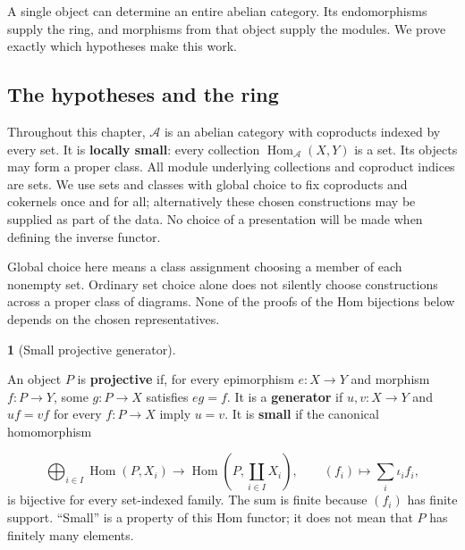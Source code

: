 \documentclass[11pt,a4paper]{article}
\newcommand{\mathheading}{}
\theoremstyle{plain}
\theoremstyle{definition}
\newtheorem*{definitionstatement}{\mathheading}
\newenvironment{mathdefinition}[3]{\renewcommand{\mathheading}{#1 #2}\begin{definitionstatement}[#3]}{\end{definitionstatement}}
\begin{document}
A single object can determine an entire abelian category. Its endomorphisms supply the ring, and morphisms from that object supply the modules. We prove exactly which hypotheses make this work.

 
\subsection{The hypotheses and the ring}
\label{hypotheses}
 
Throughout this chapter, \(\mathcal A\) is an abelian category with coproducts indexed by every set. It is \textbf{locally small}: every collection \(\operatorname{Hom}_{\mathcal A}(X,Y)\) is a set. Its objects may form a proper class. All module underlying collections and coproduct indices are sets. We use sets and classes with global choice to fix coproducts and cokernels once and for all; alternatively these chosen constructions may be supplied as part of the data. No choice of a presentation will be made when defining the inverse functor.

 
Global choice here means a class assignment choosing a member of each nonempty set. Ordinary set choice alone does not silently choose constructions across a proper class of diagrams. None of the proofs of the Hom bijections below depends on the chosen representatives.

 
\par{}\par
 
\begin{mathdefinition}{Definition}{8.1}{Small projective generator}
\label{env-8-1}

An object \(P\) is \textbf{projective} if, for every epimorphism \(e:X\to Y\) and morphism \(f:P\to Y\), some \(g:P\to X\) satisfies \(eg=f\). It is a \textbf{generator} if \(u,v:X\to Y\) and \(uf=vf\) for every \(f:P\to X\) imply \(u=v\). It is \textbf{small} if the canonical homomorphism

 \[\bigoplus_{i\in I}\operatorname{Hom}(P,X_i)\longrightarrow\operatorname{Hom}\!\left(P,\coprod_{i\in I}X_i\right),\qquad (f_i)\longmapsto\sum_i\iota_i f_i,\] 
is bijective for every set-indexed family. The sum is finite because \((f_i)\) has finite support. ``Small'' is a property of this Hom functor; it does not mean that \(P\) has finitely many elements.


\par{}\par

\end{mathdefinition}
 
\end{document}
